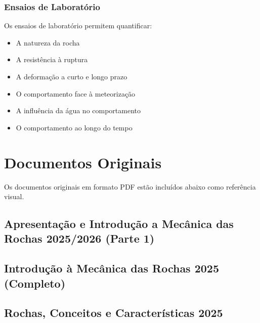 \documentclass[12pt,a4paper,twoside]{book}
\begin{document}
\subsection{Ensaios de Laboratório}

Os ensaios de laboratório permitem quantificar:
\begin{itemize}
    \item A natureza da rocha
    \item A resistência à ruptura
    \item A deformação a curto e longo prazo
    \item O comportamento face à meteorização
    \item A influência da água no comportamento
    \item O comportamento ao longo do tempo
\end{itemize}

\newpage

\appendix
\chapter{Documentos Originais}

Os documentos originais em formato PDF estão incluídos abaixo como referência visual.

\section{Apresentação e Introdução a Mecânica das Rochas 2025/2026 (Parte 1)}



\section{Introdução à Mecânica das Rochas 2025 (Completo)}



\section{Rochas, Conceitos e Características 2025}
\end{document}
